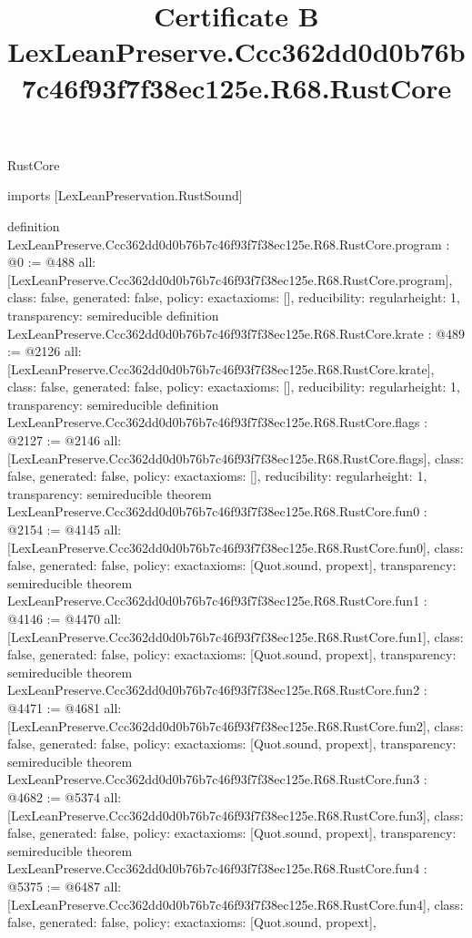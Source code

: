 \begin{lexlean}{RustCore}
\title{Certificate B LexLeanPreserve.Ccc362dd0d0b76b7c46f93f7f38ec125e.R68.RustCore}
\begin{coremodule}
imports [LexLeanPreservation.RustSound]

definition LexLeanPreserve.Ccc362dd0d0b76b7c46f93f7f38ec125e.R68.RustCore.program : @0 := @488 {
  all: [LexLeanPreserve.Ccc362dd0d0b76b7c46f93f7f38ec125e.R68.RustCore.program],
  class: false,
  generated: false,
  policy: exact{axioms: []},
  reducibility: regular{height: 1},
  transparency: semireducible
}
definition LexLeanPreserve.Ccc362dd0d0b76b7c46f93f7f38ec125e.R68.RustCore.krate : @489 := @2126 {
  all: [LexLeanPreserve.Ccc362dd0d0b76b7c46f93f7f38ec125e.R68.RustCore.krate],
  class: false,
  generated: false,
  policy: exact{axioms: []},
  reducibility: regular{height: 1},
  transparency: semireducible
}
definition LexLeanPreserve.Ccc362dd0d0b76b7c46f93f7f38ec125e.R68.RustCore.flags : @2127 := @2146 {
  all: [LexLeanPreserve.Ccc362dd0d0b76b7c46f93f7f38ec125e.R68.RustCore.flags],
  class: false,
  generated: false,
  policy: exact{axioms: []},
  reducibility: regular{height: 1},
  transparency: semireducible
}
theorem LexLeanPreserve.Ccc362dd0d0b76b7c46f93f7f38ec125e.R68.RustCore.fun0 : @2154 := @4145 {
  all: [LexLeanPreserve.Ccc362dd0d0b76b7c46f93f7f38ec125e.R68.RustCore.fun0],
  class: false,
  generated: false,
  policy: exact{axioms: [Quot.sound, propext]},
  transparency: semireducible
}
theorem LexLeanPreserve.Ccc362dd0d0b76b7c46f93f7f38ec125e.R68.RustCore.fun1 : @4146 := @4470 {
  all: [LexLeanPreserve.Ccc362dd0d0b76b7c46f93f7f38ec125e.R68.RustCore.fun1],
  class: false,
  generated: false,
  policy: exact{axioms: [Quot.sound, propext]},
  transparency: semireducible
}
theorem LexLeanPreserve.Ccc362dd0d0b76b7c46f93f7f38ec125e.R68.RustCore.fun2 : @4471 := @4681 {
  all: [LexLeanPreserve.Ccc362dd0d0b76b7c46f93f7f38ec125e.R68.RustCore.fun2],
  class: false,
  generated: false,
  policy: exact{axioms: [Quot.sound, propext]},
  transparency: semireducible
}
theorem LexLeanPreserve.Ccc362dd0d0b76b7c46f93f7f38ec125e.R68.RustCore.fun3 : @4682 := @5374 {
  all: [LexLeanPreserve.Ccc362dd0d0b76b7c46f93f7f38ec125e.R68.RustCore.fun3],
  class: false,
  generated: false,
  policy: exact{axioms: [Quot.sound, propext]},
  transparency: semireducible
}
theorem LexLeanPreserve.Ccc362dd0d0b76b7c46f93f7f38ec125e.R68.RustCore.fun4 : @5375 := @6487 {
  all: [LexLeanPreserve.Ccc362dd0d0b76b7c46f93f7f38ec125e.R68.RustCore.fun4],
  class: false,
  generated: false,
  policy: exact{axioms: [Quot.sound, propext]},
}
\end{coremodule}
\end{lexlean}
